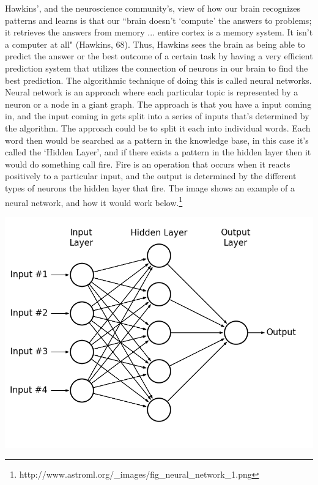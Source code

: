\documentclass[11pt, oneside]{article}
\begin{document}
\par Hawkins', and the neuroscience community's, view of how our brain recognizes patterns and learns is that our ``brain doesn't `compute' the answers to problems; it retrieves the answers from memory ... entire cortex is a memory system. It isn't a computer at all" (Hawkins, 68). Thus, Hawkins sees the brain as being able to predict the answer or the best outcome of a certain task by having a very efficient prediction system that utilizes the connection of neurons in our brain to find the best prediction. The algorithmic technique of doing this is called neural networks. Neural network is an approach where each particular topic is represented by a neuron or a node in a giant graph. The approach is that you have a input coming in, and the input coming in gets split into a series of inputs that's determined by the algorithm. The approach could be to split it each into individual words. Each word then would be searched as a pattern in the knowledge base, in this case it's called the `Hidden Layer', and if there exists a pattern in the hidden layer then it would do something call fire. Fire is an operation that occurs when it reacts positively to a particular input, and the output is determined by the different types of neurons the hidden layer that fire. The image shows an example of a neural network, and how it would work below.\footnote{http://www.astroml.org/\_images/fig\_neural\_network\_1.png}

\includegraphics[scale=0.5]{fig_neural_network_1.png}
\end{document}
